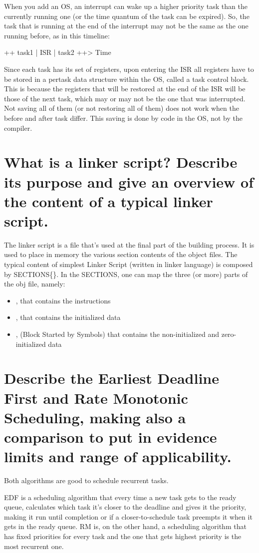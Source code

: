 When you add an OS, an interrupt can wake up a higher priority task than the currently running one (or the time quantum of the task can be expired). So, the task that is running at the end of the interrupt may not be the same as the one running before, as in this timeline: 


++ task1 | ISR | task2 ++> Time


Since each task has its set of registers, upon entering the ISR all registers have to be stored in a per­task data structure within the OS, called a task control block. This is because the registers that will be restored at the end of the ISR will be those of the next task, which may or may not be the one that was interrupted. Not saving all of them (or not restoring all of them) does not work when the before and after task differ. This saving is done by code in the OS, not by the compiler.

\section{What is a linker script? Describe its purpose and give an overview of the content of a typical linker script.}
The linker script is a file that's used at the final part of the building process. It is used to place in memory the various section contents of the object files. 
The typical content of simplest Linker Script (written in linker language) is composed by SECTIONS\{\}.
In the SECTIONS, one can map the three (or more) parts of the obj file, namely:
\begin{itemize}
	\item {}, that contains the instructions
	\item {}, that contains the initialized data
	\item {}, (Block Started by Symbols) that contains the non-initialized and zero-initialized data
\end{itemize}


\section{Describe the Earliest Deadline First and Rate Monotonic Scheduling, making also a comparison to put in evidence limits and range of applicability.}

Both algorithms are good to schedule recurrent tasks.

EDF is a scheduling algorithm that every time a new task gets to the ready queue, calculates which task it's closer to the deadline and gives it the priority, making it run until completion or if a closer-to-schedule task preempts it when it gets in the ready queue. 
RM is, on the other hand, a scheduling algorithm that has fixed priorities for every task and the one that gets highest priority is the most recurrent one.

